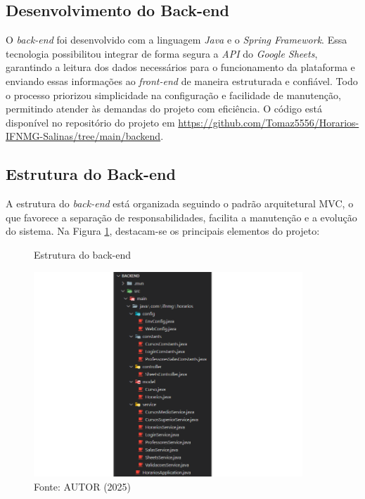 \subsection{Desenvolvimento do Back-end}

O \textit{back-end} foi desenvolvido com a linguagem \textit{Java} e o \textit{Spring Framework}. Essa tecnologia possibilitou integrar de forma segura a \textit{API} do \textit{Google Sheets}, garantindo a leitura dos dados necessários para o funcionamento da plataforma e enviando essas informações ao \textit{front-end} de maneira estruturada e confiável. Todo o processo priorizou simplicidade na configuração e facilidade de manutenção, permitindo atender às demandas do projeto com eficiência. O código está disponível no repositório do projeto em \url{https://github.com/Tomaz5556/Horarios-IFNMG-Salinas/tree/main/backend}.

\subsection{Estrutura do Back-end}

A estrutura do \textit{back-end} está organizada seguindo o padrão arquitetural MVC, o que favorece a separação de responsabilidades, facilita a manutenção e a evolução do sistema. Na Figura \ref{fig_back_1}, destacam-se os principais elementos do projeto:

\begin{figure}[htb]
    \centering
    \caption{Estrutura do back-end}
    \includegraphics[width=0.9\textwidth]{Figuras/back-1.png}
    \caption*{Fonte: AUTOR (2025)}
    \label{fig_back_1}
\end{figure}

